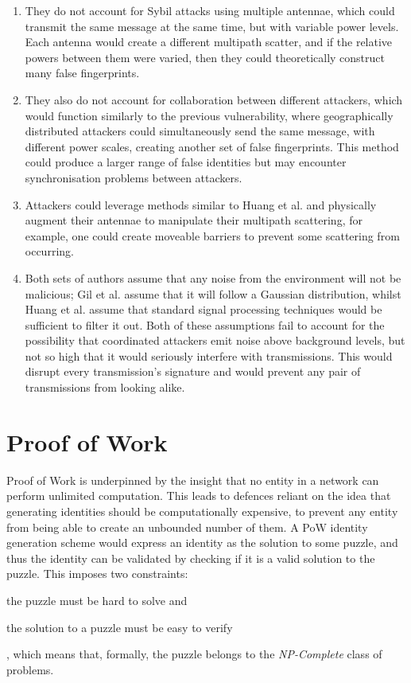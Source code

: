 \begin{enumerate}
    \item They do not account for Sybil attacks using multiple antennae, which could transmit the same message at the same time, but with variable power levels. Each antenna would create a different multipath scatter, and if the relative powers between them were varied, then they could theoretically construct many false fingerprints.
    \item They also do not account for collaboration between different attackers, which would function similarly to the previous vulnerability, where geographically distributed attackers could simultaneously send the same message, with different power scales, creating another set of false fingerprints. This method could produce a larger range of false identities but may encounter synchronisation problems between attackers.
    \item Attackers could leverage methods similar to Huang et al. and physically augment their antennae to manipulate their multipath scattering, for example, one could create moveable barriers to prevent some scattering from occurring.
    \item Both sets of authors assume that any noise from the environment will not be malicious; Gil et al. assume that it will follow a Gaussian distribution, whilst Huang et al. assume that standard signal processing techniques would be sufficient to filter it out. Both of these assumptions fail to account for the possibility that coordinated attackers emit noise above background levels, but not so high that it would seriously interfere with transmissions. This would disrupt every transmission's signature and would prevent any pair of transmissions from looking alike.
\end{enumerate}



\section{Proof of Work}
Proof of Work is underpinned by the insight that no entity in a network can perform unlimited computation. This leads to defences reliant on the idea that generating identities should be computationally expensive, to prevent any entity from being able to create an unbounded number of them. A PoW identity generation scheme would express an identity as the solution to some puzzle, and thus the identity can be validated by checking if it is a valid solution to the puzzle. This imposes two constraints: \begin{enumerate*}
    \item the puzzle must be hard to solve and
    \item the solution to a puzzle must be easy to verify
\end{enumerate*}, which means that, formally, the puzzle belongs to the \textit{NP-Complete} class of problems.

